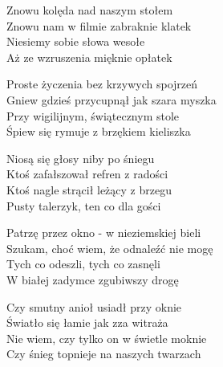 \begin{text}
    Znowu kolęda nad naszym stołem\\
    Znowu nam w filmie zabraknie klatek\\
    Niesiemy sobie słowa wesołe\\
    Aż ze wzruszenia mięknie opłatek

    Proste życzenia bez krzywych spojrzeń\\
    Gniew gdzieś przycupnął jak szara myszka\\
    Przy wigilijnym, świątecznym stole\\
    Śpiew się rymuje z brzękiem kieliszka

    Niosą się głosy niby po śniegu\\
    Ktoś zafałszował refren z radości\\
    Ktoś nagle strącił leżący z brzegu\\
    Pusty talerzyk, ten co dla gości

    Patrzę przez okno - w nieziemskiej bieli\\
    Szukam, choć wiem, że odnaleźć nie mogę\\
    Tych co odeszli, tych co zasnęli\\
    W białej zadymce zgubiwszy drogę

    Czy smutny anioł usiadł przy oknie\\
    Światło się łamie jak zza witraża\\
    Nie wiem, czy tylko on w świetle moknie\\
    Czy śnieg topnieje na naszych twarzach
\end{text}
\begin{chord}

\end{chord}